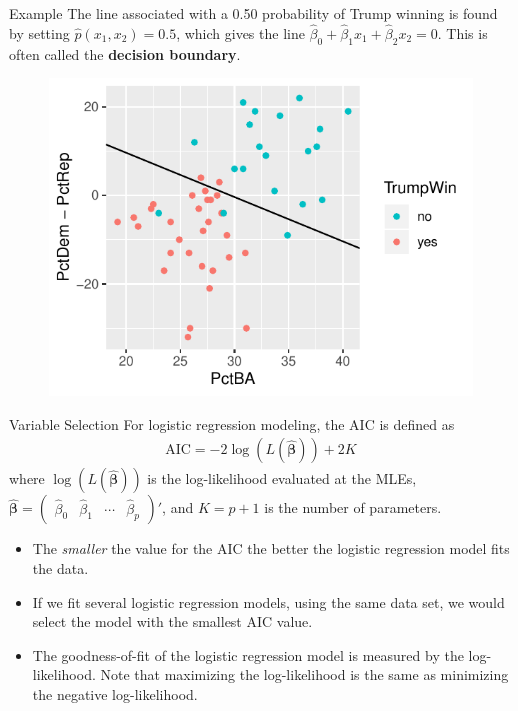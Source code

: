 \documentclass[10pt]{beamer}\usepackage[]{graphicx}\usepackage[]{color}
\begin{document}
\begin{frame}{Example}
The line associated with a 0.50 probability of Trump winning is found by setting $\hat{p}(x_1, x_2) = 0.5$, which gives the line $\hat{\beta}_0 + \hat{\beta}_1 x_1 + \hat{\beta}_2 x_2 = 0$.  This is often called the \textbf{decision boundary}.
\begin{figure}
\includegraphics[scale=0.7]{figure/scatter2.pdf}
\end{figure}
\end{frame}

\begin{frame}
\end{frame}

\begin{frame}{Variable Selection}
For logistic regression modeling, the AIC is defined as
\begin{align*}
\text{AIC} = -2 \log(L(\hat{\bm{\beta}})) + 2K
\end{align*}
where $\log(L(\hat{\bm{\beta}}))$ is the log-likelihood evaluated at the MLEs, $\bm{\hat{\beta}} = \begin{pmatrix} \hat{\beta}_0 & \hat{\beta}_1 & \cdots & \hat{\beta}_p \end{pmatrix}'$, and $K = p+1$ is the number of parameters.
\vspace{10pt}

\begin{itemize}
\item The \emph{smaller} the value for the AIC the better the logistic regression model fits the data.
\vspace{5pt}
\item If we fit several logistic regression models, using the same data set, we would select the model with the smallest AIC value.   
\vspace{5pt}
\item The goodness-of-fit of the logistic regression model is measured by the log-likelihood.  Note that maximizing the log-likelihood is the same as minimizing the negative log-likelihood.    
\end{itemize}
\end{frame}
\end{document}
